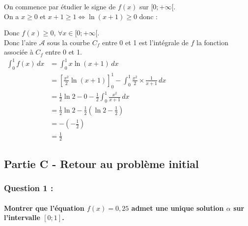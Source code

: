 \documentclass[a4paper, 12pt]{article}
\begin{document}
On commence par étudier le signe de $f(x)$ sur $[0;+\infty[$. 
\\
On a $x \geq 0$ et $x+1 \geq 1 \iff \ln{\left( x+1 \right)}\geq 0$ donc :
\begin{center}
\end{center}
Donc $f(x) \geq 0$, $\forall x \in [0;+\infty[$. 
\\
Donc l'aire $\mathcal{A}$ sous la courbe $C_f$ entre 0 et 1 est l'intégrale de $f$ la fonction associée à $C_f$ entre 0 et 1.
\\
$\begin{aligned}
    \displaystyle \int_0^1 f(x) \,dx &= \displaystyle \int_0^1 x\ln{\left( x+1 \right)} \,dx \\
    &= \left[ \frac{x^2}{2} \ln{\left( x+1 \right)} \right]_0^1 - \displaystyle \int_0^1 \frac{x^2}{2} \times \frac{1}{x+1} \,dx \\
    &= \frac{1}{2}\ln{2} - 0 - \displaystyle \frac{1}{2} \int_0^1 \frac{x^2}{x+1}\,dx \\
    &= \frac{1}{2}\ln{2} - \frac{1}{2}\left( \ln{2} - \frac{1}{2} \right) \\ 
    &= - \left( -\frac{1}{2} \right) \\
    &= \frac{1}{2}
\end{aligned}$

{}
\subsection*{Partie C - Retour au problème initial}

{}
\subsubsection*{Question 1 :}
\paragraph*{Montrer que l'équation $f(x) = 0,25$ admet une unique solution  $\alpha$ sur l'intervalle $[0;1]$.\\[5mm]}
\end{document}
